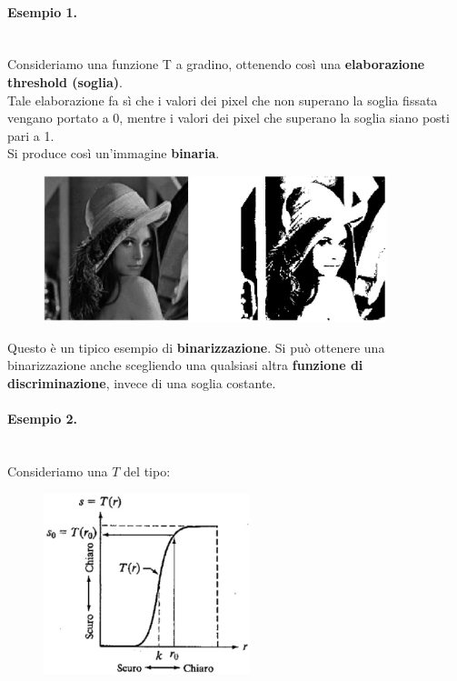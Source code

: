\paragraph{Esempio 1.} \ \\

Consideriamo una funzione T a gradino, ottenendo così una
\textbf{elaborazione threshold (soglia)}.\\
Tale elaborazione fa sì che i valori dei pixel che non superano la
soglia fissata vengano portato a 0, mentre i valori dei pixel che
superano la soglia siano posti pari a 1.\\
Si produce così un'immagine \textbf{binaria}.

\begin{figure}[H]
    \centering
    \includegraphics[width=10cm, keepaspectratio]{capitoli/immagini/imgs/foto_esempio_1.jpg}
\end{figure}

Questo è un tipico esempio di \textbf{binarizzazione}.
Si può ottenere una binarizzazione anche scegliendo una qualsiasi
altra \textbf{funzione di discriminazione}, invece di una soglia costante.

\paragraph{Esempio 2.}\ \\

Consideriamo una $T$ del tipo:

\begin{figure}[H]
    \centering
    \includegraphics[width=6cm, keepaspectratio]{capitoli/immagini/imgs/trasformazione_esempio_2.jpg}
\end{figure}

